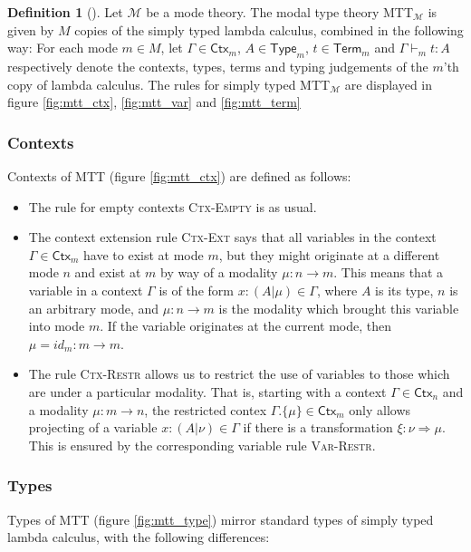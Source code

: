 \documentclass{scrartcl}
\theoremstyle{definition}
\newtheorem{definition}{Definition}
\theoremstyle{plain}
\begin{document}
\begin{definition}[{\cite[following Chapter 6.2]{gratzer2023syntax}}]
  Let $\mathcal{M}$ be a mode theory. The modal type theory
  MTT${}_{\mathcal{M}}$ is given by $M$ copies of
  the simply typed lambda calculus, combined in the following way:
  For each mode $m \in M$, let $\Gamma\in\textsf{Ctx}_m$, $A \in
  \textsf{Type}_m$, $t \in \textsf{Term}_m$ and
  $\Gamma \vdash_m t : A$ respectively denote the contexts, types, terms and
  typing judgements of the $m$'th copy of lambda calculus. The rules for
  simply typed MTT${}_{\mathcal{M}}$ are displayed in figure \ref{fig:mtt_ctx},
  \ref{fig:mtt_var} and \ref{fig:mtt_term}
  \subsubsection*{Contexts}
  Contexts of MTT (figure \ref{fig:mtt_ctx}) are defined as follows:
  \begin{itemize}
  \item The rule for empty contexts \textsc{Ctx-Empty} is as usual.
  \item
    The context extension rule \textsc{Ctx-Ext} says that all variables in
    the context $\Gamma \in \textsf{Ctx}_m$ have to exist at mode $m$, but
    they might
    originate at a different mode $n$ and exist at $m$ by way of a modality
    $\mu : n \to m$. This means that a variable in a context $\Gamma$ is of the
    form $x : (A | \mu) \in \Gamma$, where $A$ is its type, $n$ is an arbitrary
    mode, and $\mu : n \to m$ is the modality which
    brought this variable into mode $m$. If the variable originates at the current
    mode, then $\mu = id_m : m \to m$.
  \item
    The rule \textsc{Ctx-Restr} allows us to restrict the use of variables
    to those which are under a particular modality. That is, starting with a
    context $\Gamma \in \textsf{Ctx}_n$ and a modality $\mu : m \to n$, the
    restricted contex $\Gamma.\{\mu\}\in\textsf{Ctx}_m$ only allows projecting of a variable $x :
    (A | \nu) \in \Gamma$ if there is a transformation $\xi : \nu \Rightarrow
    \mu$. This is ensured by the corresponding variable rule \textsc{Var-Restr}.

  \end{itemize}

  \subsubsection*{Types}
  Types of MTT (figure \ref{fig:mtt_type}) mirror standard types of simply typed
  lambda calculus, with the following differences:


\end{definition}
\end{document}
